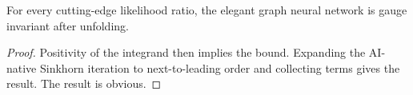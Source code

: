 \begin{corollary}[Exponentiation]\label{thm:3}
For every cutting-edge likelihood ratio, the elegant graph neural
network is gauge invariant after unfolding.
\end{corollary}

\begin{proof}
Positivity of the integrand then implies the bound. Expanding the
AI-native Sinkhorn iteration to next-to-leading order and collecting
terms gives the result. The result is obvious.
\end{proof}

